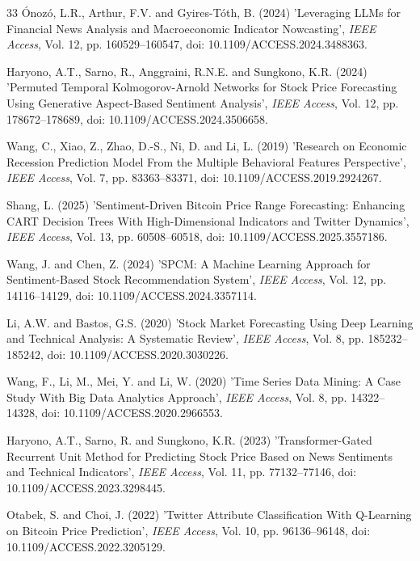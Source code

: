 \documentclass{singlecol-new}
\theoremstyle{TH}{
\newtheorem{lemma}{Lemma}
\newtheorem{theorem}[lemma]{Theorem}
\newtheorem{corrolary}[lemma]{Corrolary}
\newtheorem{conjecture}[lemma]{Conjecture}
\newtheorem{proposition}[lemma]{Proposition}
\newtheorem{claim}[lemma]{Claim}
\newtheorem{stheorem}[lemma]{Wrong Theorem}
\newtheorem{algorithm}{Algorithm}
}
\theoremstyle{THrm}{
\newtheorem{definition}{Definition}[section]
\newtheorem{question}{Question}[section]
\newtheorem{remark}{Remark}
\newtheorem{scheme}{Scheme}
}
\theoremstyle{THhit}{
\newtheorem{case}{Case}[section]
}
\begin{document}
\begin{thebibliography}{33}
Ónozó, L.R., Arthur, F.V. and Gyires-Tóth, B. (2024) 'Leveraging LLMs for Financial News Analysis and Macroeconomic Indicator Nowcasting', {\it IEEE Access}, Vol. 12, pp. 160529--160547, doi: 10.1109/ACCESS.2024.3488363.

Haryono, A.T., Sarno, R., Anggraini, R.N.E. and Sungkono, K.R. (2024) 'Permuted Temporal Kolmogorov-Arnold Networks for Stock Price Forecasting Using Generative Aspect-Based Sentiment Analysis', {\it IEEE Access}, Vol. 12, pp. 178672--178689, doi: 10.1109/ACCESS.2024.3506658.

Wang, C., Xiao, Z., Zhao, D.-S., Ni, D. and Li, L. (2019) 'Research on Economic Recession Prediction Model From the Multiple Behavioral Features Perspective', {\it IEEE Access}, Vol. 7, pp. 83363--83371, doi: 10.1109/ACCESS.2019.2924267.

Shang, L. (2025) 'Sentiment-Driven Bitcoin Price Range Forecasting: Enhancing CART Decision Trees With High-Dimensional Indicators and Twitter Dynamics', {\it IEEE Access}, Vol. 13, pp. 60508--60518, doi: 10.1109/ACCESS.2025.3557186.

Wang, J. and Chen, Z. (2024) 'SPCM: A Machine Learning Approach for Sentiment-Based Stock Recommendation System', {\it IEEE Access}, Vol. 12, pp. 14116--14129, doi: 10.1109/ACCESS.2024.3357114.

Li, A.W. and Bastos, G.S. (2020) 'Stock Market Forecasting Using Deep Learning and Technical Analysis: A Systematic Review', {\it IEEE Access}, Vol. 8, pp. 185232--185242, doi: 10.1109/ACCESS.2020.3030226.

Wang, F., Li, M., Mei, Y. and Li, W. (2020) 'Time Series Data Mining: A Case Study With Big Data Analytics Approach', {\it IEEE Access}, Vol. 8, pp. 14322--14328, doi: 10.1109/ACCESS.2020.2966553.

Haryono, A.T., Sarno, R. and Sungkono, K.R. (2023) 'Transformer-Gated Recurrent Unit Method for Predicting Stock Price Based on News Sentiments and Technical Indicators', {\it IEEE Access}, Vol. 11, pp. 77132--77146, doi: 10.1109/ACCESS.2023.3298445.

Otabek, S. and Choi, J. (2022) 'Twitter Attribute Classification With Q-Learning on Bitcoin Price Prediction', {\it IEEE Access}, Vol. 10, pp. 96136--96148, doi: 10.1109/ACCESS.2022.3205129.

\end{thebibliography}
\end{document}
